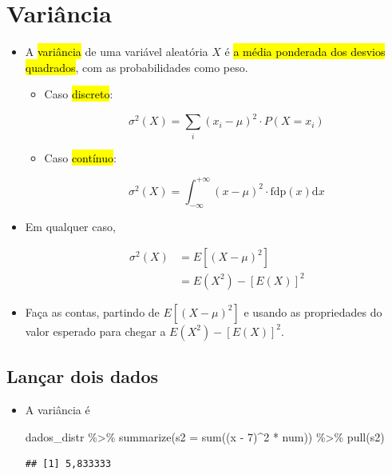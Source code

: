 \documentclass[
  11pt]{report}
\newenvironment{Shaded}{\begin{snugshade}}{\end{snugshade}}
\newcommand{\AttributeTok}[1]{\textcolor[rgb]{0.77,0.63,0.00}{#1}}
\newcommand{\DecValTok}[1]{\textcolor[rgb]{0.00,0.00,0.81}{#1}}
\newcommand{\FunctionTok}[1]{\textcolor[rgb]{0.00,0.00,0.00}{#1}}
\newcommand{\NormalTok}[1]{#1}
\newcommand{\SpecialCharTok}[1]{\textcolor[rgb]{0.00,0.00,0.00}{#1}}
\renewenvironment{Shaded}{
    \begin{mdframed}[%
      roundcorner=2pt,%
      innerleftmargin=5pt,%
      innerrightmargin=5pt,%
      topline=true,%
      leftline=true,%
      rightline=true,%
      bottomline=true,%
      linewidth=0.5pt,%
      linecolor=black!20,%
      backgroundcolor=black!2,%
      skipabove=2ex,%
      skipbelow=2.5ex%
    ]%
  }
  {
    \end{mdframed}
  }
\begin{document}
\hypertarget{variuxe2ncia-1}{%
\section{Variância}\label{variuxe2ncia-1}}

\begin{itemize}
\item
  A {\hl{variância}} de uma variável aleatória $X$ é {\hl{a média ponderada dos desvios quadrados}}, com as probabilidades como peso.

  \begin{itemize}
  \item
    Caso {\hl{discreto}}:

    \[
    \sigma^2(X) = \sum_i (x_i - \mu)^2 \cdot P(X = x_i)
    \]
  \item
    Caso {\hl{contínuo}}:

    \[
    \sigma^2(X) = \int_{-\infty}^{+\infty} (x - \mu)^2 \cdot \text{fdp}(x) \text{d}x
    \]
  \end{itemize}
\item
  Em qualquer caso,

  \[
  \begin{aligned}
    \sigma^2(X) &= E[(X - \mu)^2]\\
                &= E(X^2) - [E(X)]^2
  \end{aligned}
  \]
\item
  Faça as contas, partindo de $E[(X - \mu)^2]$ e usando as propriedades do valor esperado para chegar a $E(X^2) - [E(X)]^2$.
\end{itemize}

\hypertarget{lanuxe7ar-dois-dados-2}{%
\subsection{Lançar dois dados}\label{lanuxe7ar-dois-dados-2}}

\begin{itemize}
\item
  A variância é

\begin{Shaded}
\begin{Highlighting}[]
\NormalTok{dados\_distr }\SpecialCharTok{\%\textgreater{}\%} 
  \FunctionTok{summarize}\NormalTok{(}\AttributeTok{s2 =} \FunctionTok{sum}\NormalTok{((x }\SpecialCharTok{{-}} \DecValTok{7}\NormalTok{)}\SpecialCharTok{\^{}}\DecValTok{2} \SpecialCharTok{*}\NormalTok{ num)) }\SpecialCharTok{\%\textgreater{}\%} 
  \FunctionTok{pull}\NormalTok{(s2)}
\end{Highlighting}
\end{Shaded}

\begin{verbatim}
## [1] 5,833333
\end{verbatim}
\end{itemize}
\end{document}
